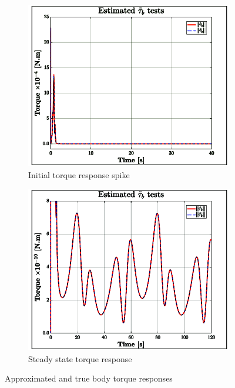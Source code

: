 \begin{figure}[hbtp]
\centering
\begin{subfigure}{0.49\textwidth}
\includegraphics[width=\textwidth]{graphs/tau-body-2}
\caption{Initial torque response spike}
\label{fig:tau-body-2}
\end{subfigure}
\begin{subfigure}{0.49\textwidth}
\centering
\includegraphics[width=\textwidth]{graphs/tau-body}
\caption{Steady state torque response}
\label{fig:tau-body-1}
\end{subfigure}
\vspace{-6pt}
\caption{Approximated and true body torque responses}
\label{fig:tau-body}
\vspace{-16pt}
\end{figure}
